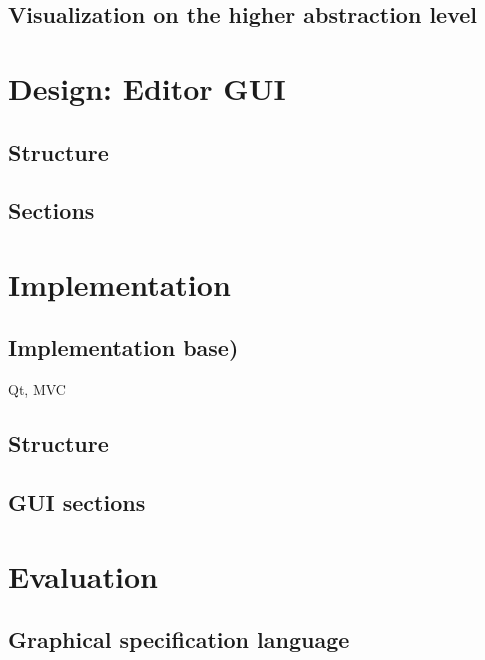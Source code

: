 \documentclass[twoside, openright, 12pt]{book}
\begin{document}
\section{Visualization on the higher abstraction level}
\label{higher_abstraction_level}




\cleardoublepage
\chapter{Design: Editor GUI}
\label{editor_design}


\section{Structure}
\label{editor_structure}


\section{Sections}
\label{editor_sections}




\cleardoublepage
\chapter{Implementation}
\label{implementation}
	
	
\section{Implementation base)}
\label{implementation_base}
Qt, MVC

\section{Structure}
\label{implementation_structure}
	
	
\section{GUI sections}
\label{implementation_sections}




\cleardoublepage
\chapter{Evaluation}
\label{evaluation}


\section{Graphical specification language}
\label{evaluation_gsl}
\end{document}
